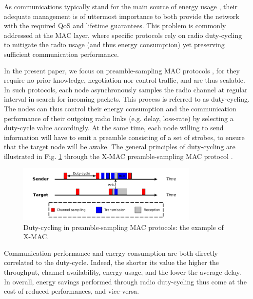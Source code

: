 \documentclass[12pt,journal,compsoc]{IEEEtran}
\begin{document}
As communications typically stand for the main source of energy usage \cite{ass02wireless}, their adequate management is of uttermost importance to both provide the network with the required QoS and lifetime guarantees. This problem is commonly addressed at the MAC layer, where specific protocols rely on radio duty-cycling to mitigate the radio usage (and thus energy consumption) yet preserving sufficient communication performance. 

In the present paper, we focus on preamble-sampling MAC protocols \cite{cbs11low}, for they require no prior knowledge, negotiation nor control traffic, and are thus scalable. In such protocols, each node asynchronously samples the radio channel at regular interval in search for incoming packets. This process is referred to as duty-cycling. The nodes can thus control their
energy consumption and the communication performance of their outgoing radio links (e.g. delay, loss-rate) by selecting a duty-cycle value accordingly. At the same time, each node willing to send information will have to emit a preamble consisting of a set of strobes, to ensure that the target node will be awake. The general principles of duty-cycling are illustrated in Fig. \ref{RW_dutycycle} through the X-MAC preamble-sampling MAC protocol \cite{bya06xmac}.

\begin{figure}
	\begin{centering}
	\includegraphics[width=0.8\textwidth]{figs/DC.png}
	\caption{Duty-cycling in preamble-sampling MAC protocols: the example of X-MAC.}
	\label{RW_dutycycle}
	\end{centering}
\end{figure}

Communication performance and energy consumption are both directly correlated to the duty-cycle. Indeed, the shorter its value the higher the throughput, channel availability, energy usage, and the lower the average delay. In overall, energy savings performed through radio duty-cycling thus come at the cost of reduced performances, and vice-versa.
\end{document}
